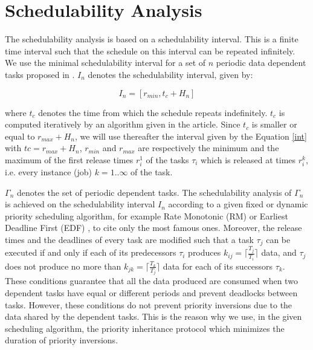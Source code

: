 \documentclass[conference,compsocconf]{IEEEtran}
\begin{document}

\section{Schedulability Analysis}

The schedulability analysis is based on a schedulability interval. This is a
finite time interval such that the schedule on this interval can be repeated
infinitely. We use the minimal schedulability interval for a set of $n$
periodic data dependent tasks proposed in \cite{ChoquetGrolleau04}. $I_n$
denotes the schedulability interval, given by:

\begin{equation}\label{int}
I_n=[r_{min},t_c+H_n] 
\end{equation}

where $t_c$ denotes the time from which the schedule repeats
indefinitely. $t_c$ is computed iteratively by an algorithm given in the
article. Since $t_c$ is smaller or equal to $r_{max}+H_n$,
we will use thereafter the interval given by the Equation \ref{int} with
$tc=r_{max}+H_n$, $r_{min}$ and $r_{max}$ are respectively the minimum and the
maximum of the first release times $r_i^1$ of the tasks $\tau_i$ which is
released at times $r_i^k$, i.e. every instance (job) $k = 1..\infty$ of the
task.

$\Gamma_n$ denotes the set of periodic dependent tasks. The schedulability
analysis of $\Gamma_n$ is achieved on the schedulability interval $I_n$
according to a given fixed or dynamic priority scheduling algorithm, for
example Rate Monotonic (RM) or Earliest Deadline First (EDF)
\cite{LiuLayland73}, to cite only the most famous ones. Moreover, the release
times and the deadlines of every task are modified such that a task $\tau_j$
can be executed if and only if each of its predecessors $\tau_i$ produces
$k_{ij}=\lceil \frac{T_j}{T_i} \rceil$ data, and $\tau_j$ does not produce no
more than $k_{jk}=\lceil \frac{T_k}{T_j} \rceil$ data for each of its
successors $\tau_k$. These conditions guarantee that all the data produced are
consumed when two dependent tasks have equal or different periods and prevent
deadlocks between tasks. However, these conditions do not prevent priority
inversions due to the data shared by the dependent tasks. This is the reason
why we use, in the given scheduling algorithm, the priority inheritance
protocol \cite{ShaRajkumarLehoczky90} which minimizes the duration of priority
inversions.
\end{document}
